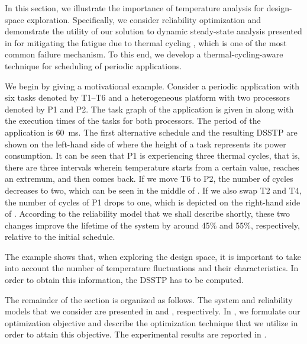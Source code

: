 In this section, we illustrate the importance of temperature analysis for
design-space exploration. Specifically, we consider reliability optimization and
demonstrate the utility of our solution to dynamic steady-state analysis
presented in  for mitigating the fatigue due to
thermal cycling \cite{jedec2010}, which is one of the most common failure
mechanism. To this end, we develop a thermal-cycling-aware technique for
scheduling of periodic applications.

We begin by giving a motivational example. Consider a periodic application with
six tasks denoted by T1--T6 and a heterogeneous platform with two processors
denoted by P1 and P2. The task graph of the application is given in
 along with the execution times of the tasks
for both processors. The period of the application is 60~ms. The first
alternative schedule and the resulting \acf{DSSTP} are shown on the left-hand
side of  where the height of a task represents
its power consumption. It can be seen that P1 is experiencing three thermal
cycles, that is, there are three intervals wherein temperature starts from a
certain value, reaches an extremum, and then comes back. If we move T6 to P2,
the number of cycles decreases to two, which can be seen in the middle of
. If we also swap T2 and T4, the number of
cycles of P1 drops to one, which is depicted on the right-hand side of
. According to the reliability model that we
shall describe shortly, these two changes improve the lifetime of the system by
around 45\% and 55\%, respectively, relative to the initial schedule.

The example shows that, when exploring the design space, it is important to
take into account the number of temperature fluctuations and their
characteristics. In order to obtain this information, the \ac{DSSTP} has to be
computed.

The remainder of the section is organized as follows. The system and reliability
models that we consider are presented in  and
, respectively. In ,
we formulate our optimization objective and describe the optimization technique
that we utilize in order to attain this objective. The experimental results are
reported in .

